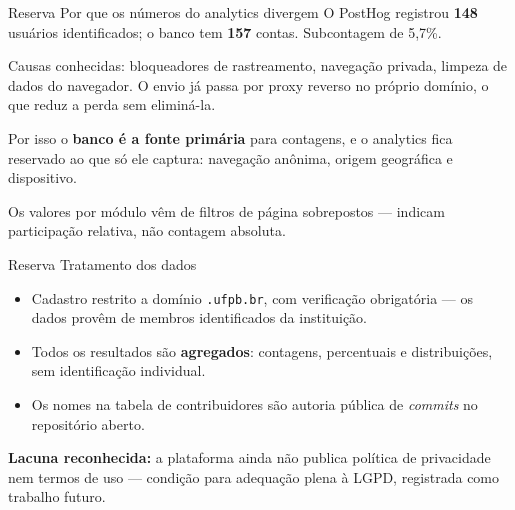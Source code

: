 \documentclass[aspectratio=169,11pt]{beamer}
\newcommand{\destaque}[1]{{\color{azul}\textbf{#1}}}
\newcommand{\nota}[1]{{\footnotesize\color{cinza}#1}}
\begin{document}
\begin{frame}{Reserva \textperiodcentered{} Por que os números do analytics divergem}
  \vspace{0.8em}
  O PostHog registrou \destaque{148} usuários identificados; o banco tem \destaque{157}
  contas. Subcontagem de 5,7\%.
  \vspace{0.8em}

  \nota{Causas conhecidas: bloqueadores de rastreamento, navegação privada, limpeza
  de dados do navegador. O envio já passa por proxy reverso no próprio domínio, o que
  reduz a perda sem eliminá-la.}
  \vspace{1.2em}

  \pause
  Por isso o \destaque{banco é a fonte primária} para contagens, e o analytics
  fica reservado ao que só ele captura: navegação anônima, origem geográfica
  e dispositivo.
  \vspace{1em}

  \nota{Os valores por módulo vêm de filtros de página sobrepostos --- indicam
  participação relativa, não contagem absoluta.}
\end{frame}

\begin{frame}{Reserva \textperiodcentered{} Tratamento dos dados}
  \vspace{0.8em}
  \begin{itemize}\setlength\itemsep{0.5em}
    \item Cadastro restrito a domínio \texttt{.ufpb.br}, com verificação obrigatória
      --- os dados provêm de membros identificados da instituição.
    \item Todos os resultados são \destaque{agregados}: contagens, percentuais e
      distribuições, sem identificação individual.
    \item Os nomes na tabela de contribuidores são autoria pública de \textit{commits}
      no repositório aberto.
  \end{itemize}
  \vspace{1.2em}
  \pause
  \destaque{Lacuna reconhecida:} a plataforma ainda não publica política de
  privacidade nem termos de uso --- condição para adequação plena à LGPD,
  registrada como trabalho futuro.
\end{frame}
\end{document}
